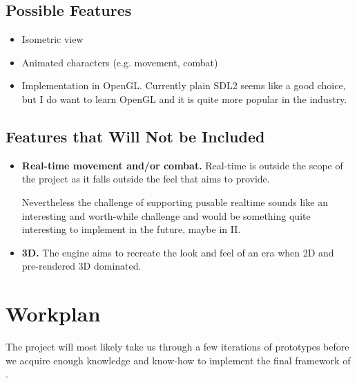 \documentclass[a4paper,10pt]{book}
\begin{document}
\section{Possible Features}
\begin{itemize}
  \item Isometric view
  \item Animated characters (e.g. movement, combat)
  \item Implementation in OpenGL. Currently plain SDL2 seems like a good choice, but I do want to learn OpenGL and it is quite more popular in the industry.
\end{itemize}

\section{Features that Will Not be Included}
\begin{itemize}
  \item \textbf{Real-time movement and/or combat.} Real-time is outside the scope of the project as it falls outside the feel that \Gamename{} aims to provide.
 
  Nevertheless the challenge of supporting pusable realtime sounds like an interesting and worth-while challenge and would be something quite interesting to implement in the future, maybe in \Enginename{} II.
 
  \item \textbf{3D.} The engine aims to recreate the look and feel of an era when 2D and pre-rendered 3D dominated.
\end{itemize}

\chapter{Workplan}
The project will most likely take us through a few iterations of prototypes before we acquire enough knowledge and know-how to implement the final framework of \Enginename{}.
\end{document}
